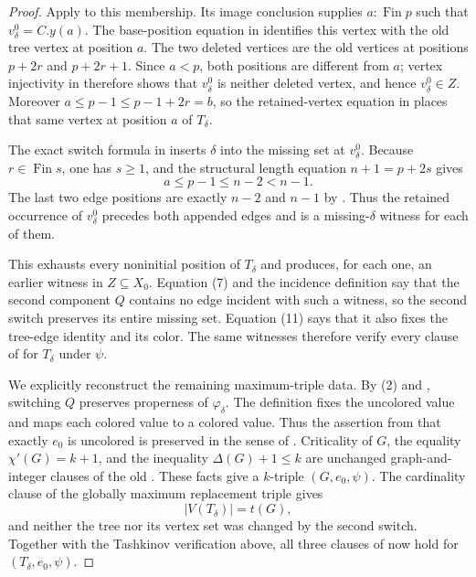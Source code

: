 \begin{proof}
Apply  to this membership.  Its
image conclusion supplies $a:\operatorname{Fin}p$ such that
$v^0_\delta=C.y(a)$.  The base-position equation in
 identifies this vertex with the
old tree vertex at position $a$.  The two deleted vertices are the old
vertices at positions $p+2r$ and $p+2r+1$.  Since $a<p$, both positions
are different from $a$; vertex injectivity in 
therefore shows that $v^0_\delta$ is neither deleted vertex, and hence
$v^0_\delta\in Z$.  Moreover
$a\leq p-1\leq p-1+2r=b$, so the retained-vertex equation in
 places that same vertex at position $a$
of $T_\delta$.

The exact switch formula in  inserts
$\delta$ into the missing set at $v^0_\delta$.  Because
$r\in\operatorname{Fin}s$, one has $s\geq1$, and the structural length
equation $n+1=p+2s$ gives
\[
 a\leq p-1\leq n-2<n-1.
\]
The last two edge positions are exactly $n-2$ and $n-1$ by
.  Thus the retained occurrence of
$v^0_\delta$ precedes both appended edges and is a missing-$\delta$
witness for each of them.

This exhausts every noninitial position of $T_\delta$ and produces, for
each one, an earlier witness in $Z\subseteq X_0$.  Equation (7) and the
incidence definition say that the second component $Q$ contains no edge
incident with such a witness, so the second switch preserves its entire
missing set.  Equation (11) says that it also fixes the tree-edge identity
and its color.  The same witnesses therefore verify every clause of
 for $T_\delta$ under $\psi$.

We explicitly reconstruct the remaining maximum-triple data.  By (2) and
, switching $Q$ preserves properness
of $\varphi_\delta$.  The definition
 fixes the uncolored value and maps each
colored value to a colored value.  Thus the assertion from
 that exactly $e_0$ is uncolored is
preserved in the sense of .  Criticality of
$G$, the equality $\chi'(G)=k+1$, and the inequality
$\Delta(G)+1\leq k$ are unchanged graph-and-integer clauses of the old
.  These facts give a $k$-triple $(G,e_0,\psi)$.  The
cardinality clause of the globally maximum replacement triple gives
\[
 |V(T_\delta)|=t(G),                                       \tag{12}
\]
and neither the tree nor its vertex set was changed by the second switch.
Together with the Tashkinov verification above, all three clauses of
 now hold for
$(T_\delta,e_0,\psi)$.


\end{proof}

